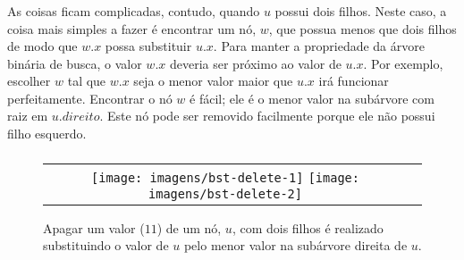 \documentclass{beamer}
\begin{document}
\begin{frame}
\frametitle{}
As coisas ficam complicadas, contudo, quando \ensuremath{\ensuremath{\ensuremath{\mathit{u}}}} possui dois filhos. Neste caso, a coisa mais simples a fazer é encontrar um nó, \ensuremath{\ensuremath{\ensuremath{\mathit{w}}}}, que possua menos que dois filhos de modo que \ensuremath{\ensuremath{\ensuremath{\mathit{w}}.\ensuremath{\mathit{x}}}} possa substituir \ensuremath{\ensuremath{\ensuremath{\mathit{u}}.\ensuremath{\mathit{x}}}}.  Para manter a propriedade da árvore binária de busca, o valor \ensuremath{\ensuremath{\ensuremath{\mathit{w}}.\ensuremath{\mathit{x}}}} deveria ser próximo ao valor de \ensuremath{\ensuremath{\ensuremath{\mathit{u}}.\ensuremath{\mathit{x}}}}.  Por exemplo, escolher \ensuremath{\ensuremath{\ensuremath{\mathit{w}}}} tal que \ensuremath{\ensuremath{\ensuremath{\mathit{w}}.\ensuremath{\mathit{x}}}} seja o menor valor maior que \ensuremath{\ensuremath{\ensuremath{\mathit{u}}.\ensuremath{\mathit{x}}}} irá funcionar perfeitamente.  Encontrar o nó \ensuremath{\ensuremath{\ensuremath{\mathit{w}}}} é fácil; ele é o menor valor na subárvore com raiz em \ensuremath{\ensuremath{\ensuremath{\mathit{u}}.\ensuremath{\mathit{direito}}}}.  Este nó pode ser removido facilmente porque ele não possui filho esquerdo.
\end{frame}

\begin{frame}
\frametitle{}
\begin{figure}
  \begin{center}
    \begin{tabular}{cc}
    \texttt{[image: imagens/bst-delete-1]}
    \texttt{[image: imagens/bst-delete-2]}
    \end{tabular}
  \end{center}
  \caption[Apagar de uma ArvoreBinariaDeBusca]{Apagar um valor ($11$) de um nó, \ensuremath{\ensuremath{\ensuremath{\mathit{u}}}}, com dois filhos é realizado substituindo o valor de \ensuremath{\ensuremath{\ensuremath{\mathit{u}}}} pelo menor valor na subárvore direita de \ensuremath{\ensuremath{\ensuremath{\mathit{u}}}}.}
\end{figure}
\end{frame}
\end{document}
